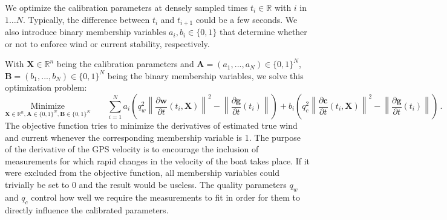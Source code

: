 \documentclass{article}
\newcommand{\quality}[1]{q_{#1}}
\newcommand{\realvec}[1]{\mathbf{#1}}
\newcommand{\norm}[1]{\left\| #1 \right\|}
\newcommand{\derivative}[2]{\frac{\partial #1}{\partial #2}}
\newcommand{\timederivative}[1]{\derivative{#1}{t}}
\newcommand{\realnumber}{\mathbb{R}}
\begin{document}
We optimize the calibration parameters at densely sampled times $t_i \in \realnumber$ with $i$ in $1 \ldots N$. Typically, the difference between $t_i$ and $t_{i+1}$ could be a few seconds. We also introduce binary membership variables $a_i, b_i \in \{0, 1\}$ that determine whether or not to enforce wind or current stability, respectively.

With $\realvec{X} \in \realnumber^n$ being the calibration parameters and $\realvec{A} = (a_1, ..., a_N) \in \{0, 1\}^N$, $\realvec{B} = (b_1, ..., b_N) \in \{0, 1\}^N$ being the binary membership variables, we solve this optimization problem:
\begin{displaymath}
\underset{\realvec{X} \in \realnumber^n, \realvec{A} \in \{0, 1\}^N, \realvec{B} \in \{0, 1\}^N}{\text{Minimize}} \qquad \sum_{i = 1}^N  a_i\left(  \quality{w}^2\norm{\timederivative{\realvec{w}}(t_i, \realvec{X})}^2 - \norm{\timederivative{\realvec{g}}(t_i)} \right)
+ b_i\left( \quality{c}^2\norm{\timederivative{\realvec{c}}(t_i, \realvec{X})}^2 - \norm{\timederivative{\realvec{g}}(t_i)}\right) \, .
\end{displaymath}
The objective function tries to minimize the derivatives of estimated true wind and current whenever the corresponding membership variable is 1. The purpose of the derivative of the GPS velocity is to encourage the inclusion of measurements for which rapid changes in the velocity of the boat takes place. If it were excluded from the objective function, all membership variables could trivially be set to 0 and the result would be useless. The quality parameters $\quality{w}$ and $\quality{c}$ control how well we require the measurements to fit in order for them to directly influence the calibrated parameters.
\end{document}

